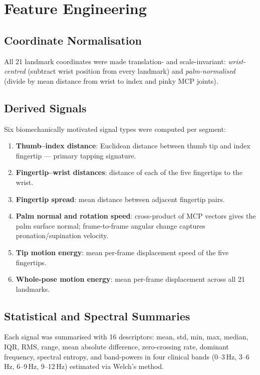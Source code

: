 \documentclass[11pt,twocolumn]{article}
\begin{document}
\section{Feature Engineering}
 
\subsection{Coordinate Normalisation}
 
All 21 landmark coordinates were made translation- and scale-invariant: \textit{wrist-centred} (subtract wrist position from every landmark) and \textit{palm-normalised} (divide by mean distance from wrist to index and pinky MCP joints).
 
\subsection{Derived Signals}
 
Six biomechanically motivated signal types were computed per segment:
 
\begin{enumerate}[leftmargin=*, topsep=1pt, itemsep=0pt]
  \item \textbf{Thumb--index distance}: Euclidean distance between thumb tip and index fingertip --- primary tapping signature.
  \item \textbf{Fingertip--wrist distances}: distance of each of the five fingertips to the wrist.
  \item \textbf{Fingertip spread}: mean distance between adjacent fingertip pairs.
  \item \textbf{Palm normal and rotation speed}: cross-product of MCP vectors gives the palm surface normal; frame-to-frame angular change captures pronation/supination velocity.
  \item \textbf{Tip motion energy}: mean per-frame displacement speed of the five fingertips.
  \item \textbf{Whole-pose motion energy}: mean per-frame displacement across all 21 landmarks.
\end{enumerate}
 
\subsection{Statistical and Spectral Summaries}
 
Each signal was summarised with 16 descriptors: mean, std, min, max, median, IQR, RMS, range, mean absolute difference, zero-crossing rate, dominant frequency, spectral entropy, and band-powers in four clinical bands (0--3\,Hz, 3--6\,Hz, 6--9\,Hz, 9--12\,Hz) estimated via Welch's method.
 
\end{document}
